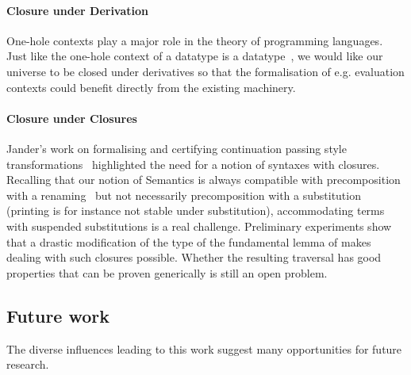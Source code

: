 {\paragraph{Closure under Derivation} One-hole contexts play a major role in the
theory of programming languages. Just like the one-hole context of a datatype is
a datatype~\cite{DBLP:journals/fuin/AbbottAMG05}, we would like our universe to
be closed under derivatives so that the formalisation of e.g. evaluation contexts
could benefit directly from the existing machinery.

\paragraph{Closure under Closures} Jander's work on formalising and certifying
continuation passing style transformations~\cite{Jander:Thesis:2019}
highlighted the need for a notion of syntaxes with closures. Recalling
that our notion of Semantics is always compatible with precomposition
with a renaming~\cite{Kaiser-wsdebr} but not necessarily
precomposition with a substitution (printing is for instance not
stable under substitution), accommodating terms with suspended
substitutions is a real challenge. Preliminary experiments show that a
drastic modification of the type of the fundamental lemma of
 makes dealing with such closures possible. Whether the
resulting traversal has good properties that can be proven generically
is still an open problem.

\subsection{Future work}

The diverse influences leading to this work suggest many opportunities for
future research.

}
